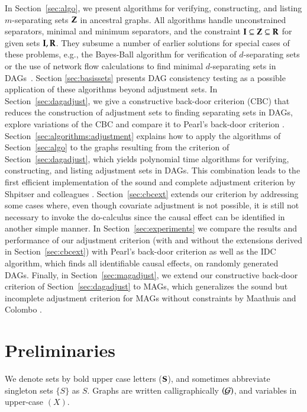 %
In Section~\ref{sec:algo}, we present algorithms for verifying, constructing, and listing $m$-separating sets $ {\bf Z} $ in ancestral graphs. All algorithms handle unconstrained separators, minimal and minimum separators, and the constraint $ {\bf I} \subseteq {\bf Z} \subseteq {\bf R} $ for given sets $ {\bf I},{\bf R} $. They subsume a number of earlier solutions for special cases of these problems, e.g., the Bayes-Ball algorithm for verification of $d$-separating sets \citep{Shachter1998} or the use of network flow calculations to find minimal $d$-separating sets in DAGs~\citep{TianPP1998,AcidC03}. 
Section \ref{sec:basissets} presents DAG consistency testing  as a possible application of these algorithms beyond adjustment sets.
%
In Section~\ref{sec:dagadjust}, we give a constructive back-door criterion (CBC) that
%
reduces the construction of adjustment sets to finding separating sets in DAGs,
explore variations of the CBC and compare it to Pearl's back-door criterion \cite{Pearl2009}. 
%
Section~\ref{sec:algorithms:adjustment} explains how to apply the algorithms of Section~\ref{sec:algo} to the graphs resulting from the criterion of Section~\ref{sec:dagadjust}, which yields polynomial time algorithms for verifying, constructing, and listing adjustment sets in DAGs. This combination leads to the first efficient implementation of the sound and complete adjustment criterion by Shpitser and colleagues \citet{ShpitserVR2010}.
%
Section~\ref{sec:cbcext} extends our criterion by addressing some cases where, even though covariate adjustment is not possible, it is still not necessary to invoke the do-calculus since  the causal effect can be identified in another simple manner. 
%
In Section~\ref{sec:experiments} we compare the results and performance of our adjustment criterion (with and without the extensions derived in Section~\ref{sec:cbcext}) with Pearl's back-door criterion as well as the IDC algorithm, which finds all identifiable causal effects, on randomly generated DAGs. 
%
Finally, in Section~\ref{sec:magadjust}, we extend our constructive back-door criterion of Section~\ref{sec:dagadjust} to MAGs, which generalizes the sound but incomplete adjustment criterion for MAGs without constraints by Maathuis and Colombo \cite{Maathuis2013}. 

%

\section{Preliminaries}\label{sec:preliminaries}


We denote sets by bold upper case letters (${\bf S}$), and sometimes
abbreviate singleton sets $\{S\}$ as $S$. Graphs are written calligraphically $({\cal G})$, and variables in upper-case $(X)$.

